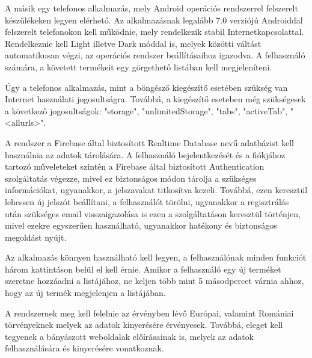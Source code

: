 A másik egy telefonos alkalmazás, mely Android operációs rendszerrel felszerelt készülékeken legyen elérhető. Az alkalmazásnak legalább 7.0 verziójú Androiddal felszerelt telefonokon kell működnie, mely rendelkezik stabil Internetkapcsolattal. Rendelkeznie kell Light illetve Dark móddal is, melyek közötti váltást automatikusan végzi, az operációs rendszer beállításaihoz igazodva. A felhasználó számára, a követett termékeit egy görgethető listában kell megjeleníteni.

Úgy a telefonos alkalmazás, mint a böngésző kiegészítő esetében szükség van Internet használati jogosultságra. Továbbá, a kiegészítő eseteben még szükségesek a következő jogosultságok: "storage", "unlimitedStorage", "tabs", "activeTab", "<all\textunderscore urls>".

A rendszer a Firebase által biztosított Realtime Database nevű adatbázist kell használnia az adatok tárolására. A felhasználó bejelentkezését és a fiókjához tartozó műveleteket szintén a Firebase által biztosított Authentication szolgáltatás végezze, mivel ez biztonságos módon tárolja a szükséges információkat, ugyanakkor, a jelszavakat titkosítva kezeli. Továbbá, ezen keresztül lehessen új jelszót beállítani, a felhasználót törölni, ugyanakkor a regisztrálás után szükséges email visszaigazolása is ezen a szolgáltatáson keresztül történjen, mivel ezekre egyszerűen használható, ugyanakkor hatékony és biztonságos megoldást nyújt.

Az alkalmazás könnyen használható kell legyen, a felhasználónak minden funkciót három kattintáson belül el kell érnie. Amikor a felhasználó egy új terméket szeretne hozzáadni a listájához, ne keljen több mint 5 másodpercet várnia ahhoz, hogy az új termék megjelenjen a listájában. 

A rendszernek meg kell felelnie az érvényben lévő Európai, valamint Romániai törvényeknek melyek az adatok kinyerésére érvényesek. Továbbá, eleget kell tegyenek a bányászott weboldalak előírásainak is, melyek az adatok felhasználására és kinyerésére vonatkoznak.
